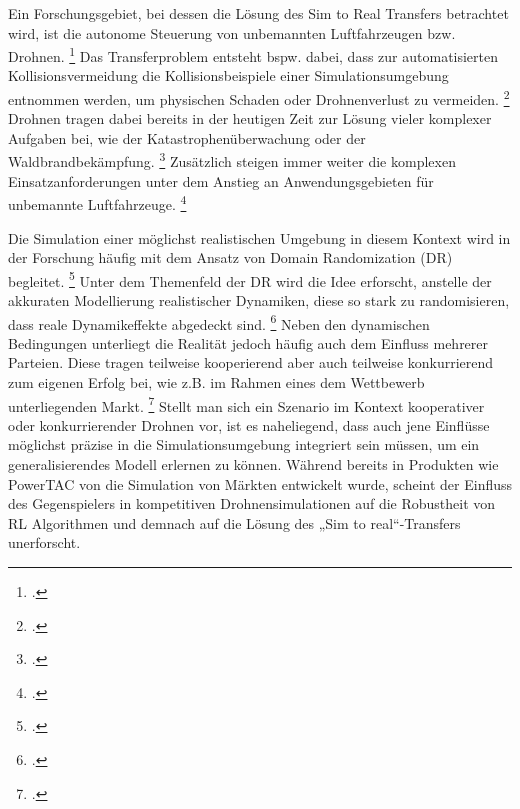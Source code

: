 Ein Forschungsgebiet, bei dessen die Lösung des Sim to Real Transfers betrachtet wird, ist die autonome Steuerung von unbemannten Luftfahrzeugen bzw. Drohnen. \footcite[Vgl.][S. 1]{Deshpande.2021}
Das Transferproblem entsteht bspw. dabei, dass zur automatisierten Kollisionsvermeidung die Kollisionsbeispiele einer Simulationsumgebung entnommen werden, um physischen Schaden oder Drohnenverlust zu vermeiden. \footcite[Vgl.][S. 4]{Sadeghi.2016}
Drohnen tragen dabei bereits in der heutigen Zeit zur Lösung vieler komplexer Aufgaben bei, wie der Katastrophenüberwachung oder der Waldbrandbekämpfung. \footcite[Vgl.][S. 1495]{Hentati.2018}
Zusätzlich steigen immer weiter die komplexen Einsatzanforderungen unter dem Anstieg an Anwendungsgebieten für unbemannte Luftfahrzeuge. \footcite[Vgl.][S. 1]{Deshpande.2020}

Die Simulation einer möglichst realistischen Umgebung in diesem Kontext wird in der Forschung häufig mit dem Ansatz von Domain Randomization (DR) begleitet. \footcite[Vgl.][S. 1]{Sadeghi.2016}
Unter dem Themenfeld der DR wird die Idee erforscht, anstelle der akkuraten Modellierung realistischer Dynamiken, diese so stark zu randomisieren, dass reale Dynamikeffekte abgedeckt sind. \footcite[Vgl.][S. 4f.]{Zhao.2020}
Neben den dynamischen Bedingungen unterliegt die Realität jedoch häufig auch dem Einfluss mehrerer Parteien.
Diese tragen teilweise kooperierend aber auch teilweise konkurrierend zum eigenen Erfolg bei, wie z.B. im Rahmen eines dem Wettbewerb unterliegenden Markt. \footcite[Vgl.][S. 2]{COLLINS2022101217}
Stellt man sich ein Szenario im Kontext kooperativer oder konkurrierender Drohnen vor, ist es naheliegend, dass auch jene Einflüsse möglichst präzise in die Simulationsumgebung integriert sein müssen, um ein generalisierendes Modell erlernen zu können.
Während bereits in Produkten wie PowerTAC von \cite[][]{COLLINS2022101217} die Simulation von Märkten entwickelt wurde, scheint der Einfluss des Gegenspielers in kompetitiven Drohnensimulationen auf die Robustheit von RL Algorithmen und demnach auf die Lösung des „Sim to real“-Transfers unerforscht.